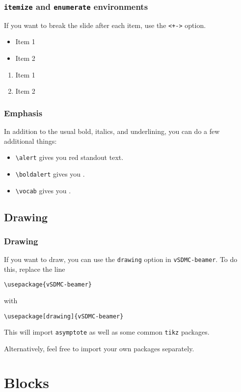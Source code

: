 \documentclass[mathserif]{beamer}
\begin{document}
\begin{frame}\frametitle{\texttt{itemize} and \texttt{enumerate} environments}
	If you want to break the slide after each item, use the \texttt{<+->} option.
	\pause
	\begin{itemize}[<+->]
		\item Item 1
		\item Item 2
	\end{itemize}
	\begin{enumerate}[<+->]
		\item Item 1
		\item Item 2
	\end{enumerate}
\end{frame}

\begin{frame}[fragile]\frametitle{Emphasis}
	In addition to the usual bold, italics, and underlining, you can do a few additional things:
	\pause
	\begin{itemize}[<+->]
		\item \verb|\alert| gives you \alert{red standout text}.
		\item \verb|\boldalert| gives you .
		\item \verb|\vocab| gives you .
	\end{itemize}
\end{frame}

\subsection{Drawing}

\begin{frame}[fragile]\frametitle{Drawing}
	If you want to draw, you can use the \texttt{drawing} option in \texttt{vSDMC-beamer}. To do this, replace the line
	
	\verb|\usepackage{vSDMC-beamer}|
	
	with
	
	\verb|\usepackage[drawing]{vSDMC-beamer}|
	
	This will import \texttt{asymptote} as well as some common \texttt{tikz} packages.
	\pause
	
	Alternatively, feel free to import your own packages separately.
\end{frame}

\section{Blocks}
\end{document}
